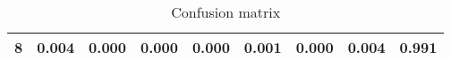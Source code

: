 \documentclass[10pt,twocolumn,letterpaper]{article}
\begin{document}
\begin{table}[h]
\begin{tabular}{l|l|l|l|l|l|l|l|l|}
    \multicolumn{1}{|l|}{\textbf{8}} & 0.004                         & 0.000                         & 0.000                         & 0.000                         & 0.001                         & 0.000                         & 0.004                         & \cellcolor[HTML]{67FD9A}0.991 \\ \hline
    \end{tabular}
    \caption{Confusion matrix}
    \label{Confusion matrix}
\end{table}




{\small


}
\end{document}
